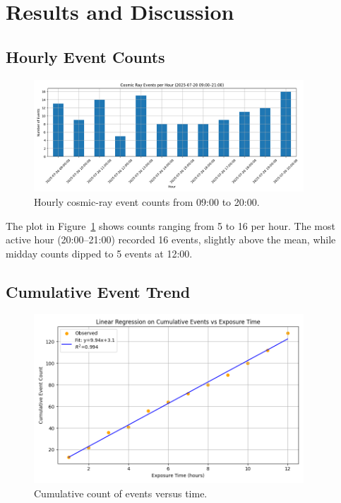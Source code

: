 \documentclass[12pt]{article}
\begin{document}
	\section{Results and Discussion}
	
	\subsection{Hourly Event Counts}
	\begin{figure}[H]
		\centering
		\includegraphics[width=0.9\textwidth]{../Data and notebooks/figures/events_per_hour.png}
		\caption{Hourly cosmic-ray event counts from 09:00 to 20:00.}
		\label{fig:hourly}
	\end{figure}
	
	The plot in Figure~\ref{fig:hourly} shows counts ranging from 5 to 16 per hour. The most active hour (20:00–21:00) recorded 16 events, slightly above the mean, while midday counts dipped to 5 events at 12:00.
	
	\subsection{Cumulative Event Trend}
	\begin{figure}[H]
		\centering
		\includegraphics[width=0.9\textwidth]{../Data and notebooks/figures/linear regression Cum-events vs Exp time.png}
		\caption{Cumulative count of events versus time.}
		\label{fig:cumulative}
	\end{figure}
	
\end{document}
